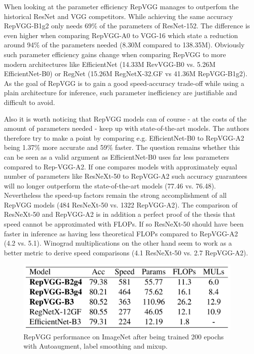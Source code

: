 When looking at the parameter efficiency RepVGG manages to outperfom the historical ResNet and VGG competitors. While achieving the same accuracy RepVGG-B1g2 only needs 69\% of the parameters of ResNet-152. The difference is even higher when comparing RepVGG-A0 to VGG-16 which state a reduction around 94\% of the parameters needed (8.30M compared to 138.35M). Obviously such parameter efficiency gains change when comparing RepVGG to more modern architectures like EfficientNet (14.33M RevVGG-B0 vs. 5.26M EfficientNet-B0) or RegNet (15.26M RegNetX-32.GF vs 41.36M RepVGG-B1g2). As the goal of RepVGG is to gain a good speed-accuracy trade-off while using a plain architecture for inference, such parameter inefficiency are justifiable and difficult to avoid. 

Also it is worth noticing that RepVGG models can of course - at the costs of the amount of parameters needed - keep up with state-of-the-art models. The authors therefore try to make a point by comparing e.g. EfficientNet-B0 to RepVGG-A2 being 1.37\% more accurate and 59\% faster. The question remains whether this can be seen as a valid argument as EfficientNet-B0 uses far less parameters compared to Rep-VGG-A2. If one compares models with approximately equal number of parameters like ResNeXt-50 to RepVGG-A2 such accuracy guarantees will no longer outperform the state-of-the-art models (77.46 vs. 76.48). Nevertheless the speed-up factors remain the strong accomplishment of all RepVGG models (484 ResNeXt-50 vs. 1322 RepVGG-A2). The comparison of ResNeXt-50 and RepVGG-A2 is in addition a perfect proof of the thesis that speed cannot be approximated with FLOPs. If so ResNeXt-50 should have been faster in inference as having less theoretical FLOPs compared to RepVGG-A2 (4.2 vs. 5.1). Winograd multiplications on the other hand seem to work as a better metric to derive speed comparisons (4.1 ResNeXt-50 vs. 2.7 RepVGG-A2). 

\begin{figure}[t]
	\begin{center}
		\includegraphics[width=0.8\linewidth]{images/results2.PNG}
	\end{center}
	\caption{RepVGG performance on ImageNet after being trained 200 epochs with Autoaugment, label smoothing and mixup.}
	\label{fig:results2}
\end{figure}


